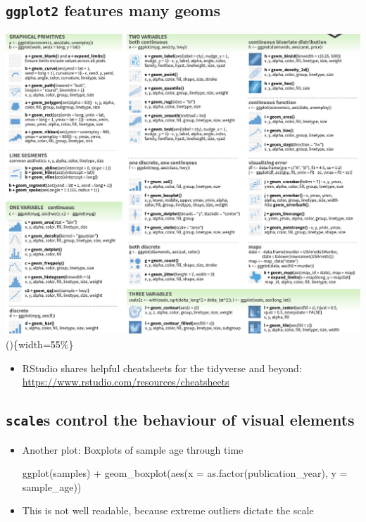 \documentclass[
  letterpaper,
]{book}
\newenvironment{Shaded}{}{}
\newcommand{\AttributeTok}[1]{\textcolor[rgb]{0.84,0.23,0.29}{#1}}
\newcommand{\FunctionTok}[1]{\textcolor[rgb]{0.44,0.26,0.76}{#1}}
\newcommand{\NormalTok}[1]{\textcolor[rgb]{0.14,0.16,0.18}{#1}}
\newcommand{\SpecialCharTok}[1]{\textcolor[rgb]{0.00,0.36,0.77}{#1}}
\providecommand{\tightlist}{%
  \setlength{\itemsep}{0pt}\setlength{\parskip}{0pt}}\usepackage{longtable,booktabs,array}
\begin{document}
\hypertarget{ggplot2-features-many-geoms}{%
\subsection{\texorpdfstring{\texttt{ggplot2} features many
geoms}{ggplot2 features many geoms}}\label{ggplot2-features-many-geoms}}

\includegraphics{assets/images/chapters/introduction-to-r/geom_cheatsheet.png}()\{width=55\%\}

\begin{itemize}
\tightlist
\item
  RStudio shares helpful cheatsheets for the tidyverse and beyond:
  \url{https://www.rstudio.com/resources/cheatsheets}
\end{itemize}

\hypertarget{scales-control-the-behaviour-of-visual-elements}{%
\subsection{\texorpdfstring{\texttt{scale}s control the behaviour of
visual
elements}{scales control the behaviour of visual elements}}\label{scales-control-the-behaviour-of-visual-elements}}

\begin{itemize}
\item
  Another plot: Boxplots of sample age through time

\begin{Shaded}
\begin{Highlighting}[]
\FunctionTok{ggplot}\NormalTok{(samples) }\SpecialCharTok{+}
\FunctionTok{geom\_boxplot}\NormalTok{(}\FunctionTok{aes}\NormalTok{(}\AttributeTok{x =} \FunctionTok{as.factor}\NormalTok{(publication\_year), }\AttributeTok{y =}\NormalTok{ sample\_age))}
\end{Highlighting}
\end{Shaded}
\item
  This is not well readable, because extreme outliers dictate the scale
\end{itemize}
\end{document}
